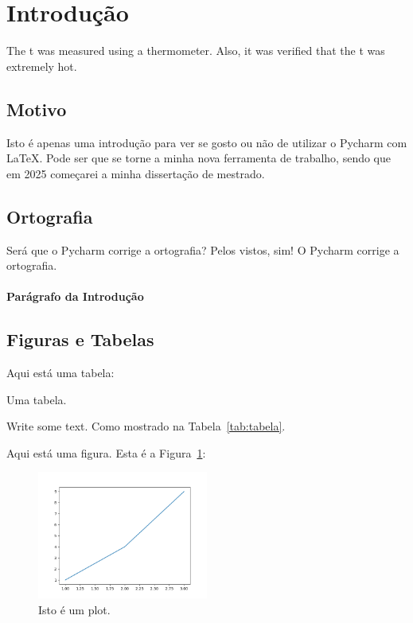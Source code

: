 \section{Introdução}\label{sec:introducao}

    The \ac{t} was measured using a thermometer.
    Also, it was verified that the \ac{t} was extremely hot.


    \lipsum[1]

    \subsection{Motivo}\label{subsec:motivo}

    Isto é apenas uma introdução para ver se gosto ou não de utilizar o Pycharm com \LaTeX.
    Pode ser que se torne a minha nova ferramenta de trabalho, sendo que em 2025 começarei a minha dissertação de mestrado.
    \lipsum[1]

    \subsection{Ortografia}\label{subsec:ortografia}

    Será que o Pycharm corrige a ortografia?
    Pelos vistos, sim!
    O Pycharm corrige a ortografia.
    \lipsum[2]

    \paragraph{Parágrafo da Introdução} \lipsum[3]

    \subsection{Figuras e Tabelas}\label{subsec:figuras-e-tabelas}

    Aqui está uma tabela:

    \begin{table}[htb!]
        \centering
        
        \caption{Uma tabela.}\label{tab:tabela}
    \end{table}

    Write some text.
    Como mostrado na Tabela~\ref{tab:tabela}. \lipsum[5]

    Aqui está uma figura.
    Esta é a Figura~\ref{fig:figure}:
    \begin{figure}[htb!]
        \centering
        \includegraphics[width=0.5\textwidth]{figures/figure}
        \caption{Isto é um plot.}\label{fig:figure}
    \end{figure}

